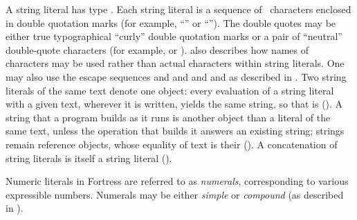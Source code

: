 A string literal has type .
Each string literal is a sequence of \unicode\ characters enclosed in double
quotation marks (for example,
``'' or ``'').
The double quotes may be either true typographical ``curly'' double  quotation marks
or a pair of ``neutral'' double-quote characters (for example,
 or ).
 also describes how names of
characters may be used rather than actual characters within string literals.
One may also use the escape sequences  and 
and  and  and  as described in \cite{JLS}.
Two string literals of the same text denote one object: every evaluation of a
string literal with a given text, wherever it is written, yields the same
string, so that
 is 
().
A string that a program builds as it runs is another object than a literal of
the same text, unless the operation that builds it answers an existing string;
strings remain reference objects, whose equality of text is their \EXP{=}
().
A concatenation of string literals is itself a string literal
().


Numeric literals in Fortress are referred to as \emph{numerals},
corresponding to various expressible numbers.
Numerals may be either \emph{simple} or \emph{compound}
(as described in ).

